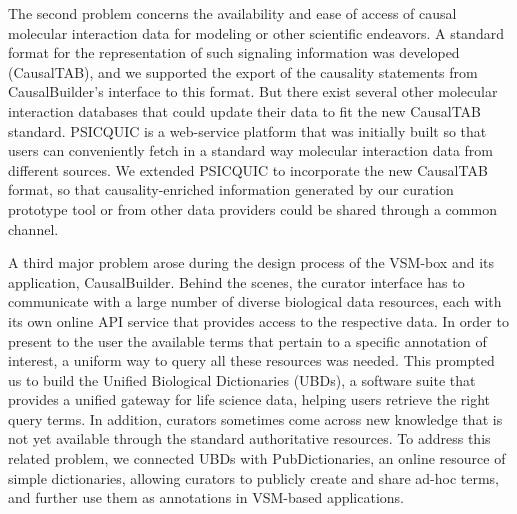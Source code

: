 \documentclass[
  12pt,
]{book}
\begin{document}
\newpage

The second problem concerns the availability and ease of access of causal molecular interaction data for modeling or other scientific endeavors.
A standard format for the representation of such signaling information was developed (CausalTAB), and we supported the export of the causality statements from CausalBuilder's interface to this format.
But there exist several other molecular interaction databases that could update their data to fit the new CausalTAB standard.
PSICQUIC is a web-service platform that was initially built so that users can conveniently fetch in a standard way molecular interaction data from different sources.
We extended PSICQUIC to incorporate the new CausalTAB format, so that causality-enriched information generated by our curation prototype tool or from other data providers could be shared through a common channel.

A third major problem arose during the design process of the VSM-box and its application, CausalBuilder.
Behind the scenes, the curator interface has to communicate with a large number of diverse biological data resources, each with its own online API service that provides access to the respective data.
In order to present to the user the available terms that pertain to a specific annotation of interest, a uniform way to query all these resources was needed.
This prompted us to build the Unified Biological Dictionaries (UBDs), a software suite that provides a unified gateway for life science data, helping users retrieve the right query terms.
In addition, curators sometimes come across new knowledge that is not yet available through the standard authoritative resources.
To address this related problem, we connected UBDs with PubDictionaries, an online resource of simple dictionaries, allowing curators to publicly create and share ad-hoc terms, and further use them as annotations in VSM-based applications.
\end{document}

